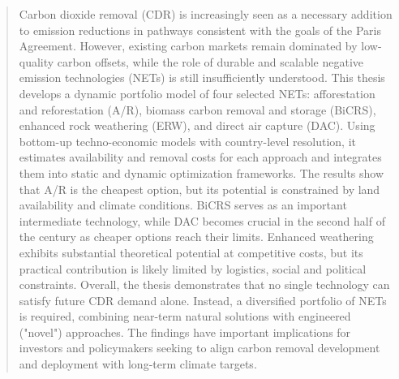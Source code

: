 \begin{abstract}
Carbon dioxide removal (CDR) is increasingly seen as a necessary addition to emission reductions in pathways consistent with the goals of the Paris Agreement. However, existing carbon markets remain dominated by low-quality carbon offsets, while the role of durable and scalable negative emission technologies (NETs) is still insufficiently understood. This thesis develops a dynamic portfolio model of four selected NETs: afforestation and reforestation (A/R), biomass carbon removal and storage (BiCRS), enhanced rock weathering (ERW), and direct air capture (DAC). Using bottom-up techno-economic models with country-level resolution, it estimates availability and removal costs for each approach and integrates them into static and dynamic optimization frameworks. The results show that A/R is the cheapest option, but its potential is constrained by land availability and climate conditions. BiCRS serves as an important intermediate technology, while DAC becomes crucial in the second half of the century as cheaper options reach their limits. Enhanced weathering exhibits substantial theoretical potential at competitive costs, but its practical contribution is likely limited by logistics, social and political constraints. Overall, the thesis demonstrates that no single technology can satisfy future CDR demand alone. Instead, a diversified portfolio of NETs is required, combining near-term natural solutions with engineered ("novel") approaches. The findings have important implications for investors and policymakers seeking to align carbon removal development and deployment with long-term climate targets.
\end{abstract}
